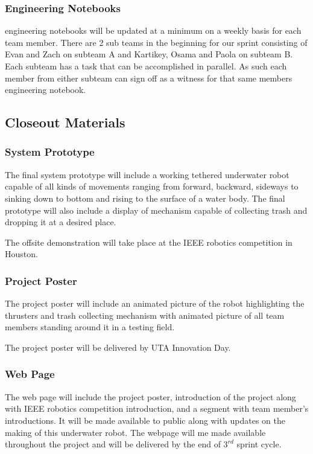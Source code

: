 \subsubsection{Engineering Notebooks}
engineering notebooks will be updated at a minimum on a weekly basis for each team member. There are 2 sub teams in the beginning for our sprint consisting of Evan and Zach on subteam A and Kartikey, Osama and Paola on subteam B. Each subteam has a task that can be accomplished in parallel. As such each member from either subteam can sign off as a witness for that same members engineering notebook.

\subsection{Closeout Materials}


\subsubsection{System Prototype}
The final system prototype will include a working tethered underwater robot capable of all kinds of movements ranging from forward, backward, sideways to sinking down to bottom and rising to the surface of a water body. The final prototype will also include a display of mechanism capable of collecting trash and dropping it at a desired place.  

The offsite demonstration will take place at the IEEE robotics competition in Houston.  

\subsubsection{Project Poster}
The project poster will include an animated picture of the robot highlighting the thrusters and trash collecting mechanism with animated picture of all team members standing around it in a testing field.  

The project poster will be delivered by UTA Innovation Day.

\subsubsection{Web Page}
The web page will include the project poster, introduction of the project along with IEEE robotics competition introduction, and a segment with team member's introductions. It will be made available to public along with updates on the making of this underwater robot. The webpage will me made available throughout the project and will be delivered by the end of $3^{rd}$ sprint cycle.  

